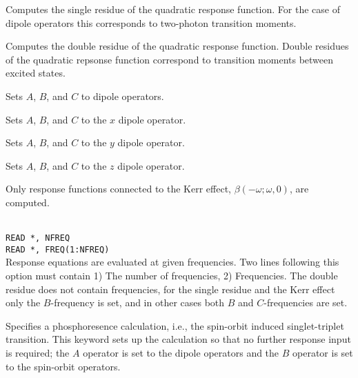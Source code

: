 \begin{description}

\item{}
Computes the single residue of the quadratic
response function.
For the case of dipole operators this corresponds to two-photon
transition
moments.

\item{}
Computes the double residue of the quadratic
response function.
Double residues of the quadratic repsonse function correspond to transition
moments between excited states. 

\item{}
Sets $A$, $B$, and $C$ to dipole operators.

\item{}
Sets $A$, $B$, and $C$ to the $x$ dipole operator.

\item{}
Sets $A$, $B$, and $C$ to the $y$ dipole operator.

\item{}
Sets $A$, $B$, and $C$ to the $z$ dipole operator.

\item{}
Only response functions connected to the Kerr effect, 
$\beta(-\omega; \omega,0)$, are computed.

\item{}\\
\verb|READ *, NFREQ|\\
\verb|READ *, FREQ(1:NFREQ)|\\
Response equations are evaluated at given
frequencies. Two lines 
following this option must contain 1) The number of frequencies, 2)
Frequencies.  The double residue does not contain frequencies, for the
single residue and the Kerr effect only the $B$-frequency is set,
and in other cases both $B$ and $C$-frequencies are set.

\item{}
Specifies a phosphoresence calculation, i.e.,
the spin-orbit 
induced singlet-triplet transition. This keyword sets up the  
calculation so that no further response input is required; the
$A$ operator is set to the dipole operators and
the $B$ operator  
is set to the spin-orbit
operators. \cite{ovhapjhjajthjojcp97,haovbmaqc27} 


\end{description}
